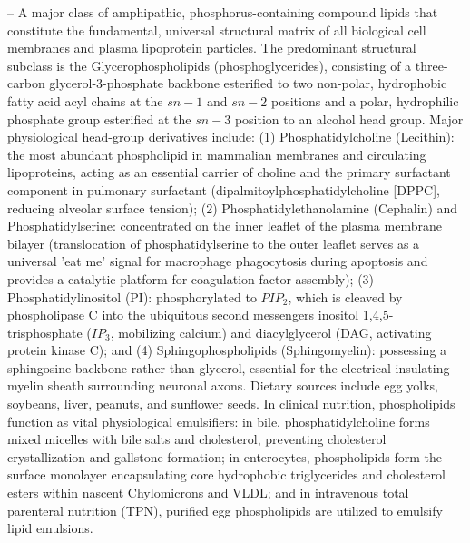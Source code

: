 -- A major class of amphipathic, phosphorus-containing compound lipids that constitute the fundamental, universal structural matrix of all biological cell membranes and plasma lipoprotein particles. The predominant structural subclass is the Glycerophospholipids (phosphoglycerides), consisting of a three-carbon glycerol-3-phosphate backbone esterified to two non-polar, hydrophobic fatty acid acyl chains at the $sn-1$ and $sn-2$ positions and a polar, hydrophilic phosphate group esterified at the $sn-3$ position to an alcohol head group. Major physiological head-group derivatives include: (1) Phosphatidylcholine (Lecithin): the most abundant phospholipid in mammalian membranes and circulating lipoproteins, acting as an essential carrier of choline and the primary surfactant component in pulmonary surfactant (dipalmitoylphosphatidylcholine [DPPC], reducing alveolar surface tension); (2) Phosphatidylethanolamine (Cephalin) and Phosphatidylserine: concentrated on the inner leaflet of the plasma membrane bilayer (translocation of phosphatidylserine to the outer leaflet serves as a universal 'eat me' signal for macrophage phagocytosis during apoptosis and provides a catalytic platform for coagulation factor assembly); (3) Phosphatidylinositol (PI): phosphorylated to $PIP_2$, which is cleaved by phospholipase C into the ubiquitous second messengers inositol 1,4,5-trisphosphate ($IP_3$, mobilizing calcium) and diacylglycerol (DAG, activating protein kinase C); and (4) Sphingophospholipids (Sphingomyelin): possessing a sphingosine backbone rather than glycerol, essential for the electrical insulating myelin sheath surrounding neuronal axons. Dietary sources include egg yolks, soybeans, liver, peanuts, and sunflower seeds. In clinical nutrition, phospholipids function as vital physiological emulsifiers: in bile, phosphatidylcholine forms mixed micelles with bile salts and cholesterol, preventing cholesterol crystallization and gallstone formation; in enterocytes, phospholipids form the surface monolayer encapsulating core hydrophobic triglycerides and cholesterol esters within nascent Chylomicrons and VLDL; and in intravenous total parenteral nutrition (TPN), purified egg phospholipids are utilized to emulsify lipid emulsions.

